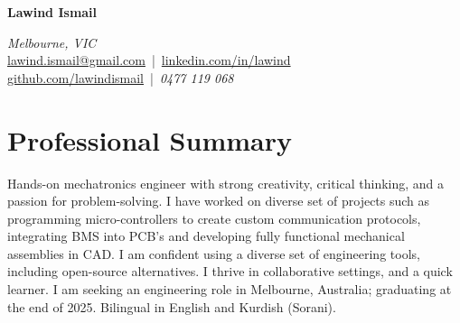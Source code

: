 \documentclass[11pt,a4paper]{article}
\begin{document}
\begin{center}
    {\Huge \bfseries Lawind Ismail}
    \vspace{5pt}

    \textit{Melbourne, VIC} \\
    \vspace{3pt}
    \href{mailto:lawind.ismail@gmail.com}{lawind.ismail@gmail.com} \,|\,
    \href{https://www.linkedin.com/in/lawind}{linkedin.com/in/lawind} \\
    \href{https://github.com/lawindismail}{github.com/lawindismail} \,|\,
    \textit{0477 119 068}
\end{center}

\section{Professional Summary}
\justifying
Hands-on mechatronics engineer with strong creativity, critical thinking, and a passion for problem-solving. I have worked on diverse set of projects such as programming micro-controllers to create custom communication protocols, integrating BMS into PCB's and developing fully functional mechanical assemblies in CAD. I am confident using a diverse set of engineering tools, including open-source alternatives. I thrive in collaborative settings, and a quick learner. I am seeking an engineering role in Melbourne, Australia; graduating at the end of 2025. Bilingual in English and Kurdish (Sorani).

\end{document}
